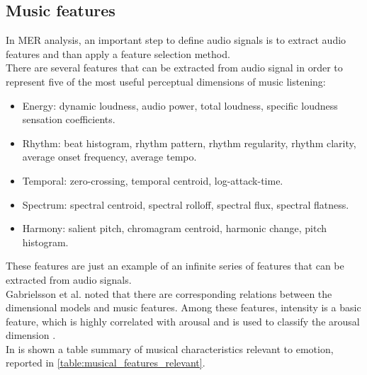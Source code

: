 \subsection{Music features}
In MER analysis, an important step to define audio signals is to extract audio features and than apply a feature selection method.
\\
There are several features that can be extracted from audio signal in order to represent five of the most useful perceptual dimensions of music listening:
\begin{itemize}
	\item Energy: dynamic loudness, audio power, total loudness, specific loudness sensation coefficients.
	\item Rhythm: beat histogram, rhythm pattern, rhythm regularity, rhythm clarity, average onset frequency, average tempo.
	\item Temporal: zero-crossing, temporal centroid, log-attack-time.
	\item Spectrum: spectral centroid, spectral rolloff, spectral flux, spectral flatness.
	\item Harmony: salient pitch, chromagram centroid, harmonic change, pitch histogram.
\end{itemize}
These features are just an example of an infinite series of features that can be extracted from audio signals.
\\ \indent
Gabrielsson et al. \cite{gabrielsson2001influence} noted that there are corresponding relations between the dimensional models and music features. Among these features, intensity is a basic feature, which is highly correlated with arousal and is used to classify the arousal dimension \cite{zhang2017feature}.
\\
In \cite{panda2018novel} is shown a table summary of musical characteristics relevant to emotion, reported in \ref{table:musical_features_relevant}.

